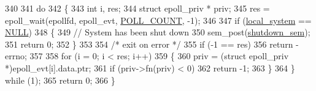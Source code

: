 \begin{DoxyCode}
340 
341     \textcolor{keywordflow}{do}
342     \{
343         \textcolor{keywordtype}{int} i, res;
344         \textcolor{keyword}{struct }epoll\_priv * priv;
345         res = epoll\_wait(epollfd, epoll\_evt, \hyperlink{classavdecc__lib_1_1system__layer2__multithreaded__callback_a617559bbc3d02eeb189fad2c9979ef53a524137542af79e43a9d8f75c2f0511be}{POLL\_COUNT}, -1);
346 
347         \textcolor{keywordflow}{if} (\hyperlink{namespaceavdecc__lib_ac8524539181fa62deed358df4dcf507c}{local\_system} == \hyperlink{openavb__types__base__pub_8h_a070d2ce7b6bb7e5c05602aa8c308d0c4}{NULL})
348         \{
349             \textcolor{comment}{// System has been shut down}
350             sem\_post(\hyperlink{classavdecc__lib_1_1system__layer2__multithreaded__callback_a7e593cf9438c43b3faa7688ee06ebf1b}{shutdown\_sem});
351             \textcolor{keywordflow}{return} 0;
352         \}
353 
354         \textcolor{comment}{/* exit on error */}
355         \textcolor{keywordflow}{if} (-1 == res)
356             \textcolor{keywordflow}{return} -errno;
357 
358         \textcolor{keywordflow}{for} (i = 0; i < res; i++)
359         \{
360             priv = (\textcolor{keyword}{struct }epoll\_priv *)epoll\_evt[i].data.ptr;
361             if (priv->fn(priv) < 0)
362                 \textcolor{keywordflow}{return} -1;
363         \}
364     \} \textcolor{keywordflow}{while} (1);
365     \textcolor{keywordflow}{return} 0;
366 \}
\end{DoxyCode}


